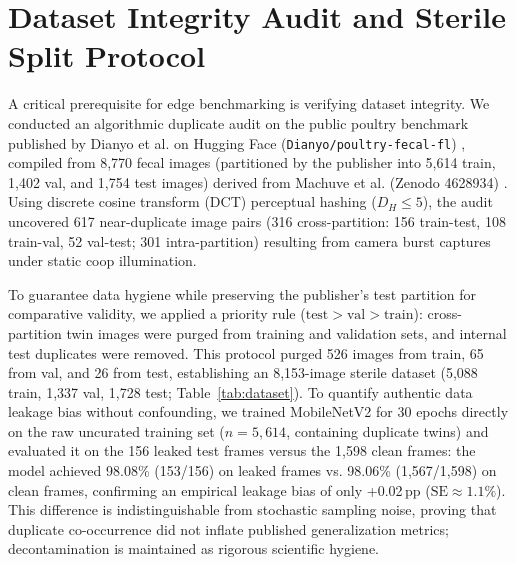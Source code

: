 \documentclass{jcse}
\begin{document}
\section{Dataset Integrity Audit and Sterile Split Protocol}
A critical prerequisite for edge benchmarking is verifying dataset integrity. We conducted an algorithmic duplicate audit on the public poultry benchmark published by Dianyo et al. on Hugging Face (\texttt{Dianyo/poultry-fecal-fl}) \cite{dianyo2022fecal}, compiled from 8,770 fecal images (partitioned by the publisher into 5,614 train, 1,402 val, and 1,754 test images) derived from Machuve et al. (Zenodo 4628934) \cite{machuve2021poultry}. Using discrete cosine transform (DCT) perceptual hashing ($D_H \le 5$), the audit uncovered 617 near-duplicate image pairs (316 cross-partition: 156 train-test, 108 train-val, 52 val-test; 301 intra-partition) resulting from camera burst captures under static coop illumination.

To guarantee data hygiene while preserving the publisher's test partition for comparative validity, we applied a priority rule ($\text{test} > \text{val} > \text{train}$): cross-partition twin images were purged from training and validation sets, and internal test duplicates were removed. This protocol purged 526 images from train, 65 from val, and 26 from test, establishing an 8,153-image sterile dataset (5,088 train, 1,337 val, 1,728 test; Table~\ref{tab:dataset}). To quantify authentic data leakage bias without confounding, we trained MobileNetV2 for 30 epochs directly on the raw uncurated training set ($n=5,614$, containing duplicate twins) and evaluated it on the 156 leaked test frames versus the 1,598 clean frames: the model achieved 98.08\% (153/156) on leaked frames vs. 98.06\% (1,567/1,598) on clean frames, confirming an empirical leakage bias of only +0.02\,pp ($\text{SE} \approx 1.1\%$). This difference is indistinguishable from stochastic sampling noise, proving that duplicate co-occurrence did not inflate published generalization metrics; decontamination is maintained as rigorous scientific hygiene.

\begin{table}
\centering
\caption{Class Distribution Across Sterile Dataset Partitions ($N=8,153$)}
\label{tab:dataset}
\end{table}
\end{document}
